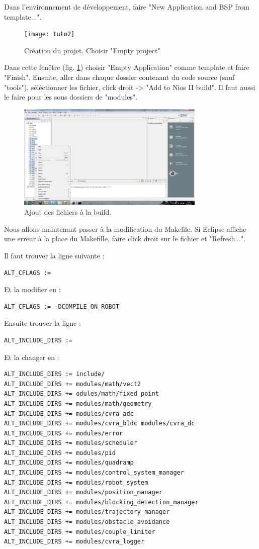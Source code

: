 \documentclass[a4paper]{paper}
\begin{document}
Dans l'environnement de développement, faire "New Application and BSP from template...".
\begin{figure}[h!]
  \centering
    \texttt{[image: tuto2]}
  \caption{Création du projet. Choisir "Empty project"}
  \label{projectcreation}
\end{figure}
Dans cette fenêtre (fig. \ref{projectcreation}) choisir "Empty Application" comme template et faire "Finish".
Ensuite, aller dans chaque dossier contenant du code source (sauf "tools"), séléctionner les fichier, 
click droit -> "Add to Nios II build". Il faut aussi le faire pour les sous dossiers de "modules".

\begin{figure}[h!]
  \centering
    \includegraphics[width=0.8\textwidth]{4}
  \caption{Ajout des fichiers à la build.}
  \label{aa}
\end{figure}


Nous allons maintenant passer à la modification du Makefile. Si Eclipse affiche une erreur à la place du Makefille, faire click droit sur le
fichier et "Refresh...". 

Il faut trouver la ligne suivante :
\begin{lstlisting}[frame=trBL]
ALT_CFLAGS := 
\end{lstlisting}
Et la modifier en :
\begin{lstlisting}[frame=trBL]
ALT_CFLAGS := -DCOMPILE_ON_ROBOT
\end{lstlisting}
Ensuite trouver la ligne :
\begin{lstlisting}[frame=trBL]
ALT_INCLUDE_DIRS :=
\end{lstlisting}
Et la changer en :
\begin{lstlisting}[frame=trBL]
ALT_INCLUDE_DIRS := include/
ALT_INCLUDE_DIRS += modules/math/vect2 
ALT_INCLUDE_DIRS += odules/math/fixed_point 
ALT_INCLUDE_DIRS += modules/math/geometry
ALT_INCLUDE_DIRS += modules/cvra_adc 
ALT_INCLUDE_DIRS += modules/cvra_bldc modules/cvra_dc
ALT_INCLUDE_DIRS += modules/error 
ALT_INCLUDE_DIRS += modules/scheduler
ALT_INCLUDE_DIRS += modules/pid 
ALT_INCLUDE_DIRS += modules/quadramp 
ALT_INCLUDE_DIRS += modules/control_system_manager
ALT_INCLUDE_DIRS += modules/robot_system 
ALT_INCLUDE_DIRS += modules/position_manager 
ALT_INCLUDE_DIRS += modules/blocking_detection_manager
ALT_INCLUDE_DIRS += modules/trajectory_manager
ALT_INCLUDE_DIRS += modules/obstacle_avoidance
ALT_INCLUDE_DIRS += modules/couple_limiter 
ALT_INCLUDE_DIRS += modules/cvra_logger
\end{lstlisting}
\end{document}
